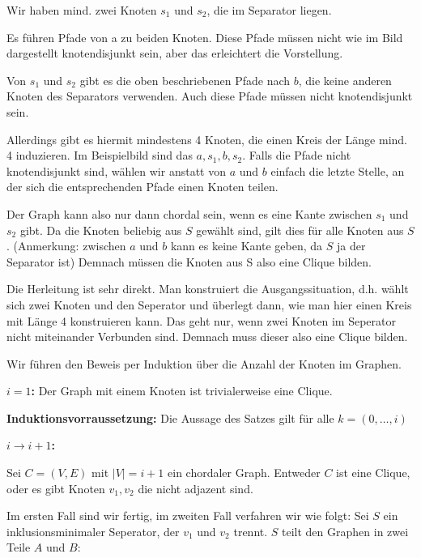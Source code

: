 Wir haben mind. zwei Knoten $s_1$ und $s_2$, die im Separator liegen.

Es führen Pfade von a zu beiden Knoten. Diese Pfade müssen nicht wie im Bild dargestellt knotendisjunkt sein, aber das erleichtert die Vorstellung.

Von $s_1$ und $s_2$ gibt es die oben beschriebenen Pfade nach $b$, die keine anderen Knoten des Separators verwenden. Auch diese Pfade müssen nicht knotendisjunkt sein.

Allerdings gibt es hiermit mindestens 4 Knoten, die einen Kreis der Länge mind. 4 induzieren. Im Beispielbild sind das $a, s_1, b, s_2$. Falls die Pfade nicht knotendisjunkt sind, wählen wir anstatt von $a$ und $b$ einfach die letzte Stelle, an der sich die entsprechenden Pfade einen Knoten teilen.

Der Graph kann also nur dann chordal sein, wenn es eine Kante zwischen $s_1$ und $s_2$ gibt. Da die Knoten beliebig aus $S$ gewählt sind, gilt dies für alle Knoten aus $S$.
(Anmerkung: zwischen $a$ und $b$ kann es keine Kante geben, da $S$ ja der Separator ist)
Demnach müssen die Knoten aus S also eine Clique bilden.

\how

Die Herleitung ist sehr direkt. Man konstruiert die Ausgangssituation, d.h. wählt sich zwei Knoten und den Seperator und überlegt dann, wie man hier einen Kreis mit Länge 4 konstruieren kann.
Das geht nur, wenn zwei Knoten im Seperator nicht miteinander Verbunden sind. Demnach muss dieser also eine Clique bilden.

\subexercise

Wir führen den Beweis per Induktion über die Anzahl der Knoten im Graphen.

\textbf{$i = 1$:}
Der Graph mit einem Knoten ist trivialerweise eine Clique.

\textbf{Induktionsvorraussetzung:}
Die Aussage des Satzes gilt für alle $k = (0, \dots, i)$

\textbf{$i \rightarrow i + 1$:}

Sei $C = (V,E)$ mit $|V| = i + 1$ ein chordaler Graph.
Entweder $C$ ist eine Clique, oder es gibt Knoten $v_1, v_2$ die nicht adjazent sind.

Im ersten Fall sind wir fertig, im zweiten Fall verfahren wir wie folgt:
Sei $S$ ein inklusionsminimaler Seperator, der $v_1$ und $v_2$ trennt.
$S$ teilt den Graphen in zwei Teile $A$ und $B$:

